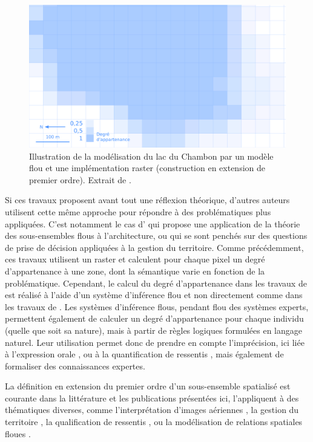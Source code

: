 \begin{figure}
  \centering
  \includegraphics{../figures/fig11.png}
  \caption{Illustration de la modélisation du lac du Chambon par un
    modèle flou et une implémentation raster (\ie construction en
    extension de premier ordre). Extrait de \textcite{Bunel2020}.}
  \label{fig:champ_raster}
\end{figure}

Si ces travaux proposent avant tout une réflexion théorique, d’autres
auteurs utilisent cette même approche pour répondre à des
problématiques plus appliquées. C’est notamment le cas
d’\textcite{Arabacioglu2010} qui propose une application de la théorie
des sous-ensembles flous à l’architecture, ou
\textcite{Kurtener2000,Makropoulos2003,Girot2007} qui se sont penchés
sur des questions de prise de décision appliquées à la gestion du
territoire. Comme précédemment, ces travaux utilisent un raster et
calculent pour chaque pixel un degré d’appartenance à une zone, dont
la sémantique varie en fonction de la problématique. Cependant, le
calcul du degré d’appartenance dans les travaux de
\textcite{Griot2007,Makropoulos2003,Arabacioglu2010} est réalisé à
l’aide d’un système d’inférence flou et non directement comme dans les
travaux de \textcite{Vanegass2011,Takemura2012}. Les systèmes
d’inférence flous, pendant flou des systèmes experts, permettent
également de calculer un degré d’appartenance pour chaque individu
(quelle que soit sa nature), mais à partir de règles logiques
formulées en langage naturel.  Leur utilisation permet donc de prendre
en compte l’imprécision, ici liée à l’expression orale
\autocite{Makropoulos2003,Griot2007}, ou à la quantification de
ressentis \autocite{Arabacioglu2010}, mais également de formaliser des
connaissances expertes.

La définition en extension du premier ordre d’un sous-ensemble
spatialisé est courante dans la littérature et les publications
présentées ici, l’appliquent à des thématiques diverses, comme
l’interprétation d’images aériennes \autocite{Brandtberg2002,
  Fonte2005}, la gestion du territoire
\autocite{Griot2007,Makropoulos2003}, la qualification de ressentis
\autocite{Arabacioglu2010}, ou la modélisation de relations spatiales
floues \textcite{Vanegass2011,Takemura2012}.

